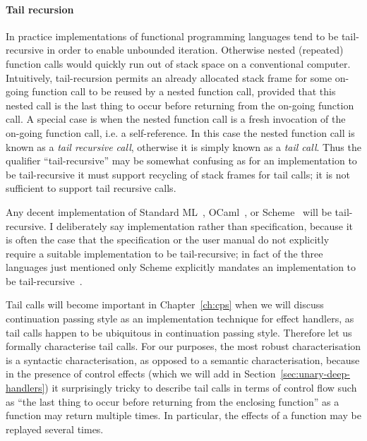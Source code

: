 \documentclass[12pt,phd,lfcs,twoside,openright,logo,leftchapter,normalheadings]{infthesis}
\theoremstyle{plain}
\theoremstyle{definition}
\begin{document}
\paragraph{Tail recursion}

In practice implementations of functional programming languages tend
to be tail-recursive in order to enable unbounded iteration. Otherwise
nested (repeated) function calls would quickly run out of stack space
on a conventional computer.
%
Intuitively, tail-recursion permits an already allocated stack frame
for some on-going function call to be reused by a nested function
call, provided that this nested call is the last thing to occur before
returning from the on-going function call.
%
A special case is when the nested function call is a fresh invocation
of the on-going function call, i.e. a self-reference. In this case the
nested function call is known as a \emph{tail recursive call},
otherwise it is simply known as a \emph{tail call}.
%
Thus the qualifier ``tail-recursive'' may be somewhat confusing as for
an implementation to be tail-recursive it must support recycling of
stack frames for tail calls; it is not sufficient to support tail
recursive calls.
%

Any decent implementation of Standard ML~\cite{MilnerTHM97},
OCaml~\cite{LeroyDFGRV20}, or Scheme~\cite{SperberDFSFM10} will be
tail-recursive. I deliberately say implementation rather than
specification, because it is often the case that the specification or
the user manual do not explicitly require a suitable implementation to
be tail-recursive; in fact of the three languages just mentioned only
Scheme explicitly mandates an implementation to be
tail-recursive~\cite{SperberDFSFM10}.
%

Tail calls will become important in Chapter~\ref{ch:cps} when we will
discuss continuation passing style as an implementation technique for
effect handlers, as tail calls happen to be ubiquitous in continuation
passing style.
%
Therefore let us formally characterise tail calls.
%
For our purposes, the most robust characterisation is a syntactic
characterisation, as opposed to a semantic characterisation, because
in the presence of control effects (which we will add in
Section~\ref{sec:unary-deep-handlers}) it surprisingly tricky to
describe tail calls in terms of control flow such as ``the last thing
to occur before returning from the enclosing function'' as a function
may return multiple times. In particular, the effects of a function
may be replayed several times.
%
\end{document}
